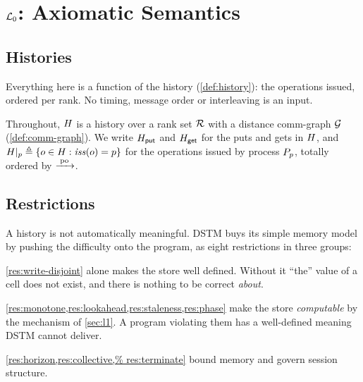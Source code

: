 \section{\texorpdfstring{$\mathcal{L}_0$}{L0}: Axiomatic Semantics}
\label{sec:l0}

\subsection{Histories}
\label{sec:l0-histories}

Everything here is a function of the \gls{history} (\cref{def:history}): the
\glspl{operation} issued, ordered per rank. No timing, message order or
interleaving is an input.

\begin{notationx}\label{not:history}
Throughout, $H$ is a history over a rank set $\mathcal{R}$ with a distance
\gls{comm-graph} $\mathcal{G}$ (\cref{def:comm-graph}). We write $H_{\mathsf{put}}$ and
$H_{\mathsf{get}}$ for the \glspl{put} and \glspl{get} in $H$, and
$H|_p \triangleq \{o \in H : \mathit{iss}(o) = p\}$ for the operations issued by
process $P_{p}$, totally ordered by $\xrightarrow{\;\mathrm{po}\;}$.
\end{notationx}

\subsection{Restrictions}
\label{sec:l0-restrictions}

A history is not automatically meaningful. DSTM buys its simple memory model
by pushing the difficulty onto the program, as eight restrictions in three
groups:



\begin{description}[leftmargin=1.1cm,style=nextline,font=\normalfont\bfseries]
  \item[Semantic] \cref{res:write-disjoint} alone makes the store well
    defined. Without it ``the'' value of a \gls{cell} does not exist, and
    there is nothing to be correct \emph{about}.
  \item[Mechanical] \cref{res:monotone,res:lookahead,res:staleness,res:phase}
    make the store \emph{computable} by the mechanism of \cref{sec:l1}. A
    program violating them has a well-defined meaning DSTM cannot deliver.
  \item[Resource and lifecycle] \cref{res:horizon,res:collective,%
    res:terminate} bound memory and govern \gls{session} structure.
\end{description}

